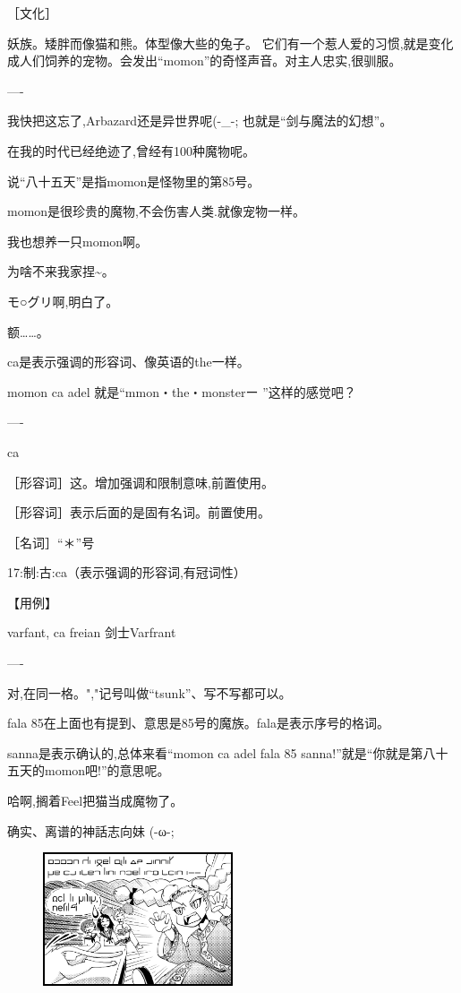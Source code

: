 ［文化］

妖族。矮胖而像猫和熊。体型像大些的兔子。
它们有一个惹人爱的习惯,就是变化成人们饲养的宠物。会发出``momon''的奇怪声音。对主人忠实,很驯服。

----

我快把这忘了,Arbazard还是异世界呢(-\_{}-; 也就是``剑与魔法的幻想''。

在我的时代已经绝迹了,曾经有100种魔物呢。

说``八十五天''是指momon是怪物里的第85号。

momon是很珍贵的魔物,不会伤害人类.就像宠物一样。

我也想养一只momon啊。

为啥不来我家捏\~{}。


モ○グリ啊,明白了。


额……。


ca是表示强调的形容词、像英语的the一样。

momon ca adel 就是``mmon・the・monsterー \FiveStar ''这样的感觉吧？

----

ca

［形容词］这。增加强调和限制意味,前置使用。

［形容词］表示后面的是固有名词。前置使用。

［名词］``＊''号

17:制:古:ca（表示强调的形容词,有冠词性）

【用例】

varfant, ca freian 剑士Varfrant

----


对,在同一格。","记号叫做``tsunk''、写不写都可以。

fala 85在上面也有提到、意思是85号的魔族。fala是表示序号的格词。


sanna是表示确认的,总体来看``momon ca adel fala 85 sanna!''就是``你就是第八十五天的momon吧!''的意思呢。

哈啊,搁着Feel把猫当成魔物了。

确实、离谱的神話志向妹 (-ω-;

\begin{figure}[H]
\includegraphics[width=0.5\textwidth]{ARKA/uni4.png}%
\end{figure}



